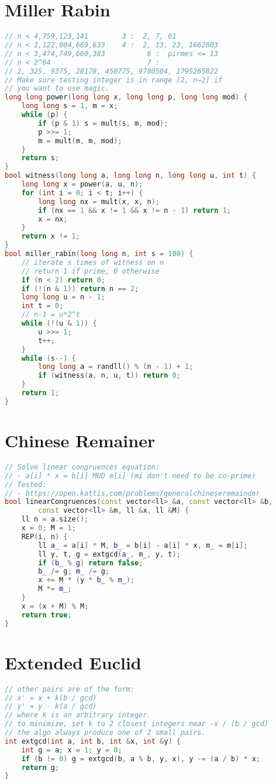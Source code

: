 \documentclass[A4 paper, 12pt]{article}
\begin{document}
	\section{Miller Rabin}
	\begin{lstlisting}[language=C++]
// n < 4,759,123,141        3 :  2, 7, 61
// n < 1,122,004,669,633    4 :  2, 13, 23, 1662803
// n < 3,474,749,660,383          6 :  pirmes <= 13
// n < 2^64                       7 :
// 2, 325, 9375, 28178, 450775, 9780504, 1795265022
// Make sure testing integer is in range [2, n−2] if
// you want to use magic.
long long power(long long x, long long p, long long mod) {
	long long s = 1, m = x;
	while (p) {
		if (p & 1) s = mult(s, m, mod);
		p >>= 1;
		m = mult(m, m, mod);
	}
	return s;
}
bool witness(long long a, long long n, long long u, int t) {
	long long x = power(a, u, n);
	for (int i = 0; i < t; i++) {
		long long nx = mult(x, x, n);
		if (nx == 1 && x != 1 && x != n - 1) return 1;
		x = nx;
	}
	return x != 1;
}
bool miller_rabin(long long n, int s = 100) {
	// iterate s times of witness on n
	// return 1 if prime, 0 otherwise
	if (n < 2) return 0;
	if (!(n & 1)) return n == 2;
	long long u = n - 1;
	int t = 0;
	// n-1 = u*2^t
	while (!(u & 1)) {
		u >>= 1;
		t++;
	}
	while (s--) {
		long long a = randll() % (n - 1) + 1;
		if (witness(a, n, u, t)) return 0;
	}
	return 1;
}
\end{lstlisting}
	\section{Chinese Remainer}
	\begin{lstlisting}[language=C++]
// Solve linear congruences equation:
// - a[i] * x = b[i] MOD m[i] (mi don't need to be co-prime)
// Tested:
// - https://open.kattis.com/problems/generalchineseremainder
bool linearCongruences(const vector<ll> &a, const vector<ll> &b,
        const vector<ll> &m, ll &x, ll &M) {
    ll n = a.size();
    x = 0; M = 1;
    REP(i, n) {
        ll a_ = a[i] * M, b_ = b[i] - a[i] * x, m_ = m[i];
        ll y, t, g = extgcd(a_, m_, y, t);
        if (b_ % g) return false;
        b_ /= g; m_ /= g;
        x += M * (y * b_ % m_);
        M *= m_;
    }
    x = (x + M) % M;
    return true;
}
\end{lstlisting}
	\section{Extended Euclid}
	\begin{lstlisting}[language=C++]
// other pairs are of the form:
// x' = x + k(b / gcd)
// y' = y - k(a / gcd)
// where k is an arbitrary integer.
// to minimize, set k to 2 closest integers near -x / (b / gcd)
// the algo always produce one of 2 small pairs.
int extgcd(int a, int b, int &x, int &y) {
    int g = a; x = 1; y = 0;
    if (b != 0) g = extgcd(b, a % b, y, x), y -= (a / b) * x;
    return g;
}
\end{lstlisting}
\end{document}
